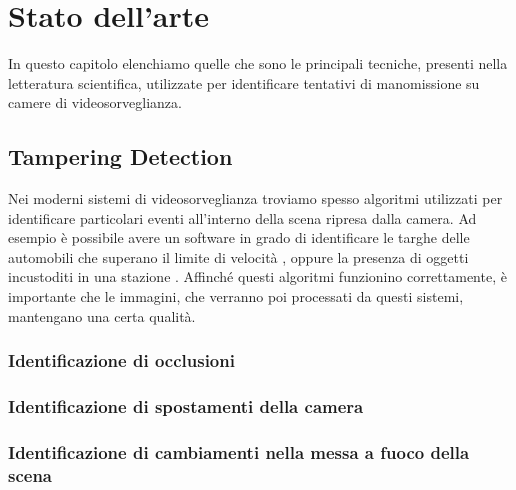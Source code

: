 \chapter{Stato dell'arte}
\label{StatoArte}
\thispagestyle{empty}

\vspace{0.5cm}

\noindent In questo capitolo elenchiamo quelle che sono le principali tecniche, presenti nella letteratura scientifica, utilizzate per identificare tentativi di manomissione su camere di videosorveglianza. 
\section{Tampering Detection}
Nei moderni sistemi di videosorveglianza troviamo spesso algoritmi utilizzati per identificare particolari eventi all'interno della scena ripresa dalla camera. 
Ad esempio \`e possibile avere un software in grado di identificare le targhe delle automobili che superano il limite di velocit\`a , oppure la presenza di oggetti incustoditi in una stazione \cite{Targhe}.
Affinch\'e questi algoritmi funzionino correttamente, \`e importante che le immagini, che verranno poi processati da questi sistemi, mantengano una certa qualit\`a.

\subsection{Identificazione di occlusioni}
\subsection{Identificazione di spostamenti della camera}
\subsection{Identificazione di cambiamenti nella messa a fuoco della scena} 